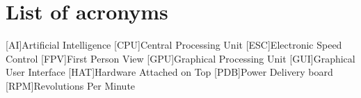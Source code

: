 \chapter*{List of acronyms}
\begin{acronym} 
    [AI]{Artificial Intelligence}
    [CPU]{Central Processing Unit}
    [ESC]{Electronic Speed Control}
    [FPV]{First Person View}
    [GPU]{Graphical Processing Unit}
    [GUI]{Graphical User Interface}
    [HAT]{Hardware Attached on Top}
    [PDB]{Power Delivery board}
    [RPM]{Revolutions Per Minute}
\end{acronym}